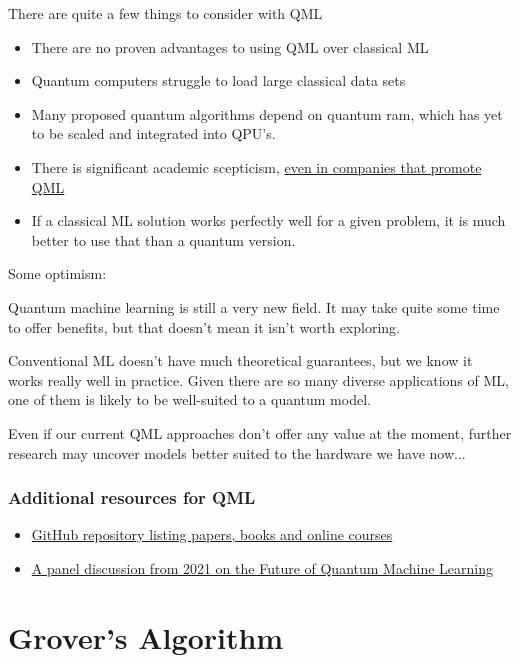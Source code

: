 \documentclass{book}
\begin{document}
There are quite a few things to consider with QML 
\begin{itemize}
    \item There are no proven advantages to using QML over classical ML 
    \item Quantum computers struggle to load large classical data sets 
    \item Many proposed quantum algorithms depend on quantum ram, which has yet to be scaled and integrated into QPU's. 
    \item There is significant academic scepticism, \href{https://www.youtube.com/watch?v=5UsJV2BNj2U&list=PLOFEBzvs-VvppIb0jg5_aDbmFs36DXD9w}{even in companies that promote QML}
    \item If a classical ML solution works perfectly well for a given problem, it is much better to use that than a quantum version. 
\end{itemize}


Some optimism: 

Quantum machine learning is still a very new field. It may take quite some time to offer benefits, but that doesn't mean it isn't worth exploring.

Conventional ML doesn't have much theoretical guarantees, but we know it works really well in practice. Given there are so many diverse applications of ML, one of them is likely to be well-suited to a quantum model.

Even if our current QML approaches don't offer any value at the moment, further research may uncover models better suited to the hardware we have now...

\subsection{Additional resources for QML}
\begin{itemize}
    \item \href{https://github.com/Christophe-pere/Roadmap-to-QML}{GitHub repository listing papers, books and online courses}
    \item \href{https://www.youtube.com/watch?v=5UsJV2BNj2U&list=PLOFEBzvs-VvppIb0jg5_aDbmFs36DXD9w}{A panel discussion from 2021 on the Future of Quantum Machine Learning}
\end{itemize}

\chapter{Grover's Algorithm}
\end{document}
